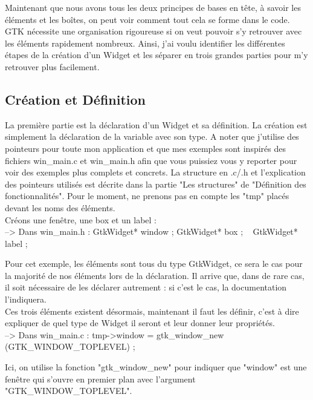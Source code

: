 \documentclass[11pt,french,a4paper]{report}
\begin{document}
Maintenant que nous avons tous les deux principes de bases en tête, à savoir les éléments et les boîtes, on peut voir comment 
tout cela se forme dans le code. \\

GTK nécessite une organisation rigoureuse si on veut pouvoir s'y retrouver avec les éléments rapidement nombreux.
Ainsi, j'ai voulu identifier les différentes étapes de la création d'un Widget et les séparer en 
trois grandes parties pour m'y retrouver plus facilement. \\

        \subsection{Création et Définition}

La première partie est la déclaration d'un Widget et sa définition. La création est simplement la déclaration de la variable 
avec son type. A noter que j'utilise des pointeurs pour toute mon application et que mes exemples 
sont inspirés des fichiers win\_main.c et win\_main.h afin que vous puissiez vous y reporter pour voir des exemples plus complets et
concrets. 
La structure en .c/.h et l'explication des pointeurs utilisés est décrite dans la partie "Les structures" de 
"Définition des fonctionnalités". Pour le moment, ne prenons pas en compte les "tmp" placés devant les noms des éléments. \\

Créons une fenêtre, une box et un label : \\
--> Dans win\_main.h : 
GtkWidget* window ; 
GtkWidget* box ;   
GtkWidget* label ;  

Pour cet exemple, les éléments sont tous du type GtkWidget, ce sera le cas pour la majorité de nos éléments lors de la 
déclaration.
Il arrive que, dans de rare cas, il soit nécessaire de les déclarer autrement : si c'est le cas, la documentation l'indiquera. \\ 


Ces trois éléments existent désormais, maintenant il faut les définir, c'est à dire expliquer de quel type de Widget il seront 
et leur donner leur propriétés. \\

--> Dans win\_main.c : 
tmp->window = gtk\_window\_new (GTK\_WINDOW\_TOPLEVEL) ;

Ici, on utilise la fonction "gtk\_window\_new" pour indiquer que "window" est une fenêtre qui s'ouvre en premier plan 
avec l'argument "GTK\_WINDOW\_TOPLEVEL". \\
\end{document}
